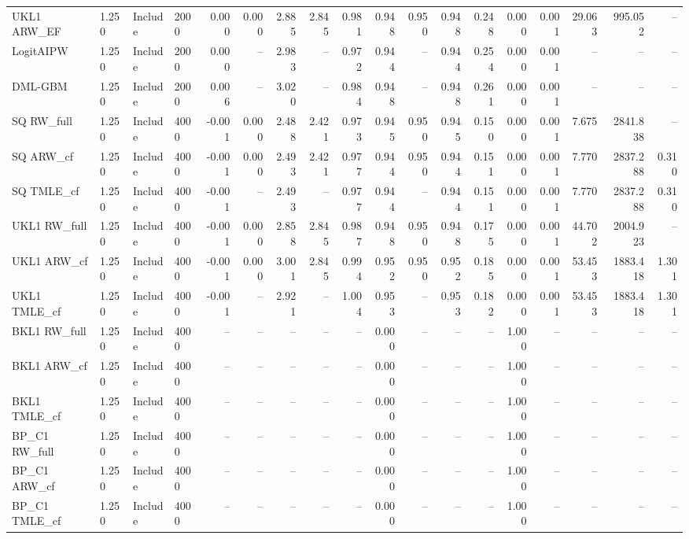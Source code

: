 \begin{tabular}{llllrrrrrrrrrrrrrr}
UKL1 ARW\_EF & 1.250 & Include & 2000 & 0.000 & 0.000 & 2.885 & 2.845 & 0.981 & 0.948 & 0.950 & 0.948 & 0.248 & 0.000 & 0.001 & 29.063 & 995.052 & -- \\
LogitAIPW & 1.250 & Include & 2000 & 0.000 & -- & 2.983 & -- & 0.972 & 0.944 & -- & 0.944 & 0.254 & 0.000 & 0.001 & -- & -- & -- \\
DML-GBM & 1.250 & Include & 2000 & 0.006 & -- & 3.020 & -- & 0.984 & 0.948 & -- & 0.948 & 0.261 & 0.000 & 0.001 & -- & -- & -- \\
SQ RW\_full & 1.250 & Include & 4000 & -0.001 & 0.000 & 2.488 & 2.421 & 0.973 & 0.945 & 0.950 & 0.945 & 0.150 & 0.000 & 0.001 & 7.675 & 2841.838 & -- \\
SQ ARW\_cf & 1.250 & Include & 4000 & -0.001 & 0.000 & 2.493 & 2.421 & 0.977 & 0.944 & 0.950 & 0.944 & 0.151 & 0.000 & 0.001 & 7.770 & 2837.288 & 0.310 \\
SQ TMLE\_cf & 1.250 & Include & 4000 & -0.001 & -- & 2.493 & -- & 0.977 & 0.944 & -- & 0.944 & 0.151 & 0.000 & 0.001 & 7.770 & 2837.288 & 0.310 \\
UKL1 RW\_full & 1.250 & Include & 4000 & -0.001 & 0.000 & 2.858 & 2.845 & 0.987 & 0.948 & 0.950 & 0.948 & 0.175 & 0.000 & 0.001 & 44.702 & 2004.923 & -- \\
UKL1 ARW\_cf & 1.250 & Include & 4000 & -0.001 & 0.000 & 3.001 & 2.845 & 0.994 & 0.952 & 0.950 & 0.952 & 0.185 & 0.000 & 0.001 & 53.453 & 1883.418 & 1.301 \\
UKL1 TMLE\_cf & 1.250 & Include & 4000 & -0.001 & -- & 2.921 & -- & 1.004 & 0.953 & -- & 0.953 & 0.182 & 0.000 & 0.001 & 53.453 & 1883.418 & 1.301 \\
BKL1 RW\_full & 1.250 & Include & 4000 & -- & -- & -- & -- & -- & 0.000 & -- & -- & -- & 1.000 & -- & -- & -- & -- \\
BKL1 ARW\_cf & 1.250 & Include & 4000 & -- & -- & -- & -- & -- & 0.000 & -- & -- & -- & 1.000 & -- & -- & -- & -- \\
BKL1 TMLE\_cf & 1.250 & Include & 4000 & -- & -- & -- & -- & -- & 0.000 & -- & -- & -- & 1.000 & -- & -- & -- & -- \\
BP\_C1 RW\_full & 1.250 & Include & 4000 & -- & -- & -- & -- & -- & 0.000 & -- & -- & -- & 1.000 & -- & -- & -- & -- \\
BP\_C1 ARW\_cf & 1.250 & Include & 4000 & -- & -- & -- & -- & -- & 0.000 & -- & -- & -- & 1.000 & -- & -- & -- & -- \\
BP\_C1 TMLE\_cf & 1.250 & Include & 4000 & -- & -- & -- & -- & -- & 0.000 & -- & -- & -- & 1.000 & -- & -- & -- & -- \\

\end{tabular}
